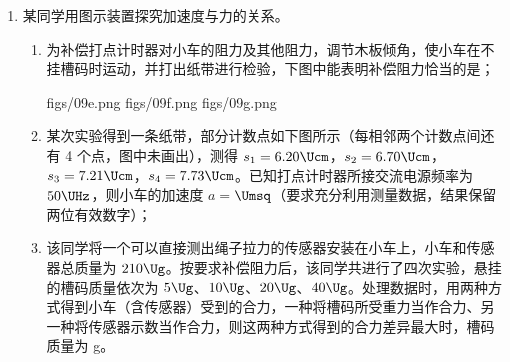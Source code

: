 \documentclass[\gkver]{gaokaozhenti}
\begin{document}
\begin{enumerate}
{（2）（i）实验中所用的滑动变阻器应选阻值较小的 C 即可；

（ii）电压表内阻远大于电源内阻，应采用相对电源的电流表外接法，使电源内阻的测量结果更接近真实值，S$_{2}$ 应与 2 端闭合。
}

\item
某同学用图示装置探究加速度与力的关系。
\begin{enumerate}
	\item
	为补偿打点计时器对小车的阻力及其他阻力，调节木板倾角，使小车在不挂槽码时运动，并打出纸带进行检验，下图中能表明补偿阻力恰当的是；

	{figs/09e.png}
	{figs/09f.png}
	{figs/09g.png}
	\item
	某次实验得到一条纸带，部分计数点如下图所示（每相邻两个计数点间还有 4 个点，图中未画出），测得 $s_{1} = 6.20 \Ucm$，$s_{2} = 6.70 \Ucm$，$s_{3} = 7.21 \Ucm$，$s_{4} = 7.73 \Ucm$。已知打点计时器所接交流电源频率为 $50 \UHz$，则小车的加速度 $a = $$\Umsq$（要求充分利用测量数据，结果保留两位有效数字）；
	\item
	该同学将一个可以直接测出绳子拉力的传感器安装在小车上，小车和传感器总质量为 $210 \Ug$。按要求补偿阻力后，该同学共进行了四次实验，悬挂的槽码质量依次为 $5 \Ug$、$10 \Ug$、$20 \Ug$、$40 \Ug$。处理数据时，用两种方式得到小车（含传感器）受到的合力，一种将槽码所受重力当作合力、另一种将传感器示数当作合力，则这两种方式得到的合力差异最大时，槽码质量为 g。
\end{enumerate}
\end{enumerate}
\end{document}
